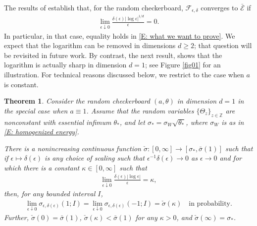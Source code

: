 \documentclass[12pt]{amsart}
\newtheorem{theorem}{Theorem}
\begin{document}
The results of \cite[Theorem 1 \& Sections 4.6--4.7]{part1} establish that, for the random checkerboard, $\mathscr{F}_{\epsilon,\delta}$ converges to $\bar{\mathscr{E}}$ if 
	\begin{align}\label{E: assumption homogenization regime}
		\lim_{ \epsilon \downarrow 0 } \frac{ \delta ( \epsilon ) | \log \epsilon |^{1/d} }{ \epsilon } = 0.
	\end{align}
In particular, in that case, equality holds in \eqref{E: what we want to prove}. We expect that the logarithm can be removed in dimensions $d \geq 2$; that question will be revisited in future work. By contrast, the next result,  shows that the logarithm is actually sharp in dimension $d = 1$; see Figure \ref{fig01} for an illustration.  For technical reasons discussed below, we restrict to the case when $a$ is constant.

	\begin{theorem} \label{T: main deviations} Consider the random checkerboard $(a,\theta)$ in dimension $d = 1$ in the special case when $a \equiv 1$.  Assume that the random variables $\{\Theta_{z}\}_{z \in \mathbb{Z} }$ are nonconstant with essential infimum $\theta_{*}$, and let $\sigma_{*} = \sigma_{W} \sqrt{ \theta_{*} }$, where $\sigma_{W}$ is as in \eqref{E: homogenized energy}.  
    
    There is a nonincreasing continuous function $\check{\sigma} : [0,\infty] \to [\sigma_{*},\bar{\sigma}(1)]$ such that if $\epsilon \mapsto \delta(\epsilon)$ is any choice of scaling such that $\epsilon^{-1} \delta(\epsilon) \to 0$ as $\epsilon \to 0$ and for which there is a constant $\kappa \in [0,\infty]$ such that 
		\begin{align} \label{E: log condition}
			\lim_{\epsilon \downarrow 0} \frac{ \delta(\epsilon) | \log \epsilon | }{ \epsilon } = \kappa,
		\end{align}
	then, for any bounded interval $I$,
		\begin{align*}
			\lim_{\epsilon \downarrow 0} \sigma_{\epsilon,\delta(\epsilon)}(1; I ) = \lim_{ \epsilon \downarrow 0 } \sigma_{\epsilon,\delta(\epsilon)} (-1; I ) = \check{\sigma}(\kappa) \quad \text{in probability.}
		\end{align*}
    Further, $\check{\sigma}(0) = \bar{\sigma}(1)$, $\check{\sigma}(\kappa) < \bar{\sigma}(1)$ for any $\kappa > 0$, and $\check{\sigma}(\infty) = \sigma_{*}$. 
	\end{theorem}
\end{document}
